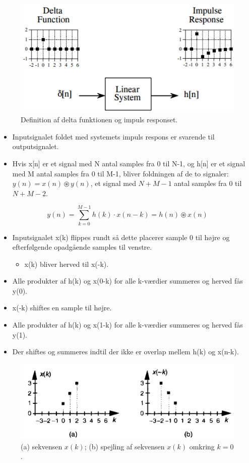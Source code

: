 \documentclass[danish]{article}
\begin{document}
\begin{figure} [H]
	\centering
	\includegraphics[width=0.6\linewidth]{graphics/deltafunction_impulseresponse}
	\caption{Definition af delta funktionen og impuls responset.}
	\label{fig:deltafunction_impulseresponse}
\end{figure}

\begin{itemize}
	\item Inputsignalet foldet med systemets impuls respons er svarende til outputsignalet.
	\item Hvis x[n] er et signal med N antal samples fra 0
	til N-1, og h[n] er et signal med M antal samples fra 0 til M-1, bliver foldningen af de to signaler:  $y(n) = x(n) \circledast y(n)$, et signal med $N+M-1$ antal samples fra 0 til $N+M-2$.
\end{itemize}

\begin{equation}
y(n) = \sum_{k=0}^{M-1} h(k) \cdot x(n-k) = h(n) \circledast x(n)
\end{equation}

\begin{itemize}
	\item Inputsignalet x(k) flippes rundt så dette placerer
	sample 0 til højre og efterfølgende opadgående samples til venstre.
	\begin{itemize}
		\item x(k) bliver herved til x(-k).
	\end{itemize}
	\item Alle produkter af h(k) og x(0-k) for alle k-værdier summeres og herved fås y(0).
	\item x(-k) shiftes en sample til højre.
	\item  Alle produkter af h(k) og x(1-k) for alle k-værdier summeres og herved fås y(1).
	\item Der shiftes og summeres indtil der ikke er overlap mellem h(k) og x(n-k).
\end{itemize}

\begin{figure}[H]
	\centering
	\includegraphics[width=0.6\linewidth]{graphics/convolution}
	\caption{(a) sekvensen $x(k)$; (b) spejling af sekvensen $x(k)$ omkring $k = 0$.}
	\label{fig:convolution}
\end{figure}
\end{document}
